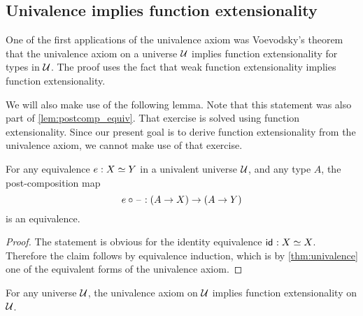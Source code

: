 \subsection{Univalence implies function extensionality}
One of the first applications of the univalence axiom was Voevodsky's theorem that the univalence axiom on a universe $\mathcal{U}$ implies function extensionality for types in $\mathcal{U}$. The proof uses the fact that weak function extensionality implies function extensionality.

We will also make use of the following lemma. Note that this statement was also part of \cref{lem:postcomp_equiv}. That exercise is solved using function extensionality. Since our present goal is to derive function extensionality from the univalence axiom, we cannot make use of that exercise.

\begin{lem}\label{lem:postcomp-equiv}
  For any equivalence $e:\eqv{X}{Y}$ in a univalent universe $\mathcal{U}$, and any type $A$, the post-composition map
  \begin{equation*}
    e\circ\mathord{\hspace{1pt}\text{--}\hspace{1pt}} : (A \to X) \to (A\to Y)
  \end{equation*}
  is an equivalence.
\end{lem}

\begin{proof}
  The statement is obvious for the identity equivalence $\idfunc : \eqv{X}{X}$. Therefore the claim follows by equivalence induction, which is by \cref{thm:univalence} one of the equivalent forms of the univalence axiom.
\end{proof}

\begin{thm}
  For any universe $\mathcal{U}$, the univalence axiom on $\mathcal{U}$ implies function extensionality on $\mathcal{U}$.
\end{thm}

